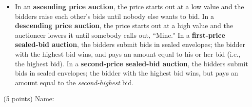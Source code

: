 \documentclass[twoside]{article}
\begin{document}
\begin{EXAM}
\begin{itemize}



\item In an \textbf{ascending price auction}, the price starts out at a low value and the bidders raise each other's bids until nobody else wants to bid. In a \textbf{descending price auction}, the price starts out at a high value and the auctioneer lowers it until somebody calls out, ``Mine." In a \textbf{first-price sealed-bid auction}, the bidders submit bids in sealed envelopes; the bidder with the highest bid wins, and pays an amount equal to his or her bid (i.e., the highest bid). In a \textbf{second-price sealed-bid auction}, the bidders submit bids in sealed envelopes; the bidder with the highest bid wins, but pays an amount equal to the \emph{second-highest} bid.
\end{itemize}
\cleardoublepage
\end{EXAM}

\begin{EXAM}


\begin{flushright}
(5 points) Name: \hspace*{1in}
\end{flushright}

\bigskip \bigskip

\end{EXAM}
\end{document}
